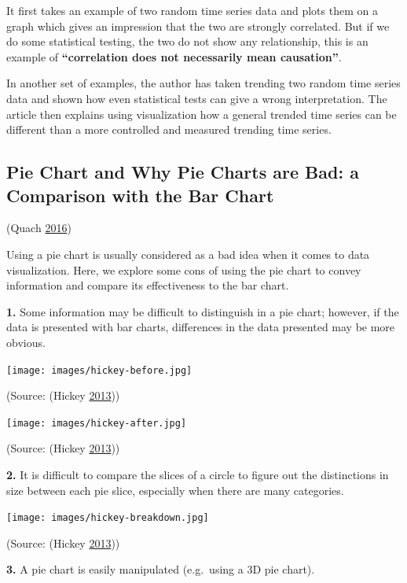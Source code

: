 \documentclass[]{book}
\begin{document}
It first takes an example of two random time series data and plots them on a graph which gives an impression that the two are strongly correlated. But if we do some statistical testing, the two do not show any relationship, this is an example of \textbf{``correlation does not necessarily mean causation''}.

In another set of examples, the author has taken trending two random time series data and shown how even statistical tests can give a wrong interpretation. The article then explains using visualization how a general trended time series can be different than a more controlled and measured trending time series.

\hypertarget{pie-chart-and-why-pie-charts-are-bad-a-comparison-with-the-bar-chart}{%
\subsection{Pie Chart and Why Pie Charts are Bad: a Comparison with the Bar Chart}\label{pie-chart-and-why-pie-charts-are-bad-a-comparison-with-the-bar-chart}}

(Quach \protect\hyperlink{ref-quach-penny}{2016})

Using a pie chart is usually considered as a bad idea when it comes to data visualization. Here, we explore some cons of using the pie chart to convey information and compare its effectiveness to the bar chart.

\textbf{1.} Some information may be difficult to distinguish in a pie chart; however, if the data is presented with bar charts, differences in the data presented may be more obvious.

\texttt{[image: images/hickey-before.jpg]}

(Source: (Hickey \protect\hyperlink{ref-hickey-pie-worst}{2013}))

\texttt{[image: images/hickey-after.jpg]}

(Source: (Hickey \protect\hyperlink{ref-hickey-pie-worst}{2013}))

\textbf{2.} It is difficult to compare the slices of a circle to figure out the distinctions in size between each pie slice, especially when there are many categories.

\texttt{[image: images/hickey-breakdown.jpg]}

(Source: (Hickey \protect\hyperlink{ref-hickey-pie-worst}{2013}))

\textbf{3.} A pie chart is easily manipulated (e.g.~using a 3D pie chart).
\end{document}
